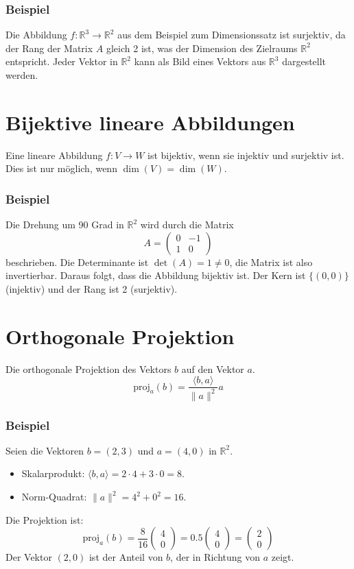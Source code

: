\subsubsection{Beispiel}
Die Abbildung \(f: \mathbb{R}^3 \to \mathbb{R}^2\) aus dem Beispiel zum Dimensionssatz ist surjektiv, da der Rang der Matrix \(A\) gleich 2 ist, was der Dimension des Zielraums \(\mathbb{R}^2\) entspricht. Jeder Vektor in \(\mathbb{R}^2\) kann als Bild eines Vektors aus \(\mathbb{R}^3\) dargestellt werden.

\section{Bijektive lineare Abbildungen}
Eine lineare Abbildung \(f: V \to W\) ist bijektiv, wenn sie injektiv und surjektiv ist. Dies ist nur möglich, wenn \(\dim(V) = \dim(W)\).

\subsubsection{Beispiel}
Die Drehung um 90 Grad in \(\mathbb{R}^2\) wird durch die Matrix
\[
    A = \begin{pmatrix} 0 & -1 \\ 1 & 0 \end{pmatrix}
\]
beschrieben. Die Determinante ist \(\det(A) = 1 \neq 0\), die Matrix ist also invertierbar. Daraus folgt, dass die Abbildung bijektiv ist. Der Kern ist \(\{(0,0)\}\) (injektiv) und der Rang ist 2 (surjektiv).

\section{Orthogonale Projektion}
Die orthogonale Projektion des Vektors \(b\) auf den Vektor \(a\).
\[
    \mathrm{proj}_{a}(b) = \frac{\langle b, a \rangle}{\|a\|^2} a
\]

\subsubsection{Beispiel}
Seien die Vektoren \(b = (2, 3)\) und \(a = (4, 0)\) in \(\mathbb{R}^2\).
\begin{itemize}
    \item Skalarprodukt: \(\langle b, a \rangle = 2 \cdot 4 + 3 \cdot 0 = 8\).
    \item Norm-Quadrat: \(\|a\|^2 = 4^2 + 0^2 = 16\).
\end{itemize}
Die Projektion ist:
\[
    \mathrm{proj}_{a}(b) = \frac{8}{16} \begin{pmatrix} 4 \\ 0 \end{pmatrix} = 0.5 \begin{pmatrix} 4 \\ 0 \end{pmatrix} = \begin{pmatrix} 2 \\ 0 \end{pmatrix}
\]
Der Vektor \((2,0)\) ist der Anteil von \(b\), der in Richtung von \(a\) zeigt.

